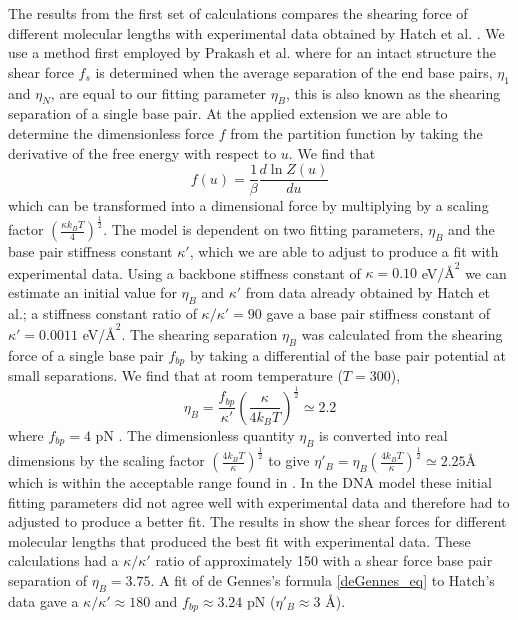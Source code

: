 The results from the first set of calculations compares the shearing force of different molecular lengths with experimental data obtained by Hatch et al. \cite{Hatch2008}. We use a method first employed by Prakash et al. \cite{Prakash2011} where for an intact structure the shear force $f_{s}$ is determined when the average separation of the end base pairs, $\eta_{1}$ and $\eta_{N}$, are equal to our fitting parameter $\eta_{B}$, this is also known as the shearing separation of a single base pair. At the applied extension we are able to determine the dimensionless force $f$ from the partition function by taking the derivative of the free energy with respect to $u$. We find that 
%
\begin{equation}
f\left(u\right)=\frac{1}{\beta}\frac{d\ln Z\left(u\right)}{du}
\end{equation}
%
which can be transformed into a dimensional force by multiplying by a scaling factor $\left(\frac{\kappa k_{B}T}{4}\right)^{\frac{1}{2}}$. The model is dependent on two fitting parameters, $\eta_{B}$ and the base pair stiffness constant $\kappa'$, which we are able to adjust to produce a fit with experimental data. Using a backbone stiffness constant of $\kappa=0.10$ eV/$\text{\AA}^{2}$ \cite{Prakash2011} we can estimate an initial value for $\eta_B$ and $\kappa'$ from data already obtained by Hatch et al.; a stiffness constant ratio of $\kappa/\kappa'=90$ gave a base pair stiffness constant of $\kappa'=0.0011$ eV/$\text{\AA}^{2}$. The shearing separation $\eta_B$ was calculated from the shearing force of a single base pair $f_{bp}$ by taking a differential of the base pair potential at small separations. We find that at room temperature ($T=300$),
%
\begin{equation}
\eta_{B}=\frac{f_{bp}}{\kappa'}\left(\frac{\kappa}{4 k_{B} T}\right)^{\frac{1}{2}} \simeq 2.2
\end{equation}
%
where $f_{bp} = 4$ pN \cite{Hatch2008}. The dimensionless quantity $\eta_{B}$ is converted into real dimensions by the scaling factor $\left(\frac{4k_{B}T}{\kappa}\right)^{\frac{1}{2}}$ to give $\eta'_{B}=\eta_{B}\left(\frac{4k_{B}T}{\kappa}\right)^{\frac{1}{2}} \simeq 2.25\textrm{\AA}$ which is within the acceptable range found in \cite{Prakash2011}. In the DNA model these initial fitting parameters did not agree well with experimental data and therefore had to adjusted to produce a better fit. The results in  show the shear forces for different molecular lengths that produced the best fit with experimental data. These calculations had a $\kappa/\kappa'$ ratio of approximately 150 with a shear force base pair separation of $\eta_B=3.75$. A fit of de Gennes's formula \eqref{deGennes_eq} to Hatch's data \cite{Hatch2008} gave a $\kappa/\kappa' \approx 180$ and $f_{bp} \approx 3.24$ pN ($\eta'_B \approx 3$ \AA).
